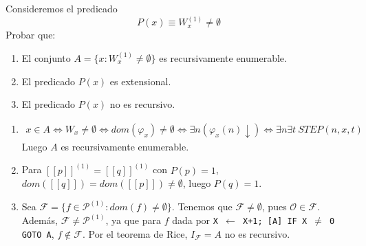 \documentclass[twoside]{article}
\begin{document}
\begin{ejercicio}{4}
Consideremos el predicado
\[ P(x) \equiv W_x^{(1)} \neq \emptyset \]
Probar que:
\begin{enumerate}
	\item El conjunto $A = \{x : W_x^{(1)} \neq \emptyset\}$ es recursivamente enumerable.
	\item El predicado $P(x)$ es extensional.
	\item El predicado $P(x)$ no es recursivo.
\end{enumerate}
\end{ejercicio}
\begin{solucion}\mbox{}
\begin{enumerate}
	\item \begin{align*}
	x \in A \Leftrightarrow W_x \neq \emptyset \Leftrightarrow dom(φ_x) \neq \emptyset \Leftrightarrow \exists n (φ_x(n) \downarrow) \Leftrightarrow \exists n \exists t\ STEP(n,x,t)
\end{align*}
Luego $A$ es recursivamente enumerable.

	\item Para $[[p]]^{(1)} = [[q]]^{(1)}$ con $P(p)=1$, $dom([[q]]) = dom([[p]]) \neq \emptyset$, luego $P(q)=1$.
	
	\item Sea $\mathcal{F} = \{f \in \mathcal{P}^{(1)} : dom(f) \neq \emptyset\}$. Tenemos que $\mathcal{F} \neq \emptyset$, pues $\mathcal{O} \in \mathcal{F}$. Además, $\mathcal{F} \neq \mathcal{P}^{(1)}$,
	 ya que para $f$ dada por \texttt{X $\leftarrow$ X+1; [A] IF X $\neq$ 0 GOTO A}, $f \notin \mathcal{F}$. Por el teorema de Rice, $I_{\mathcal{F}} = A$ no es recursivo.
\end{enumerate}
\end{solucion}

\newpage
\end{document}
